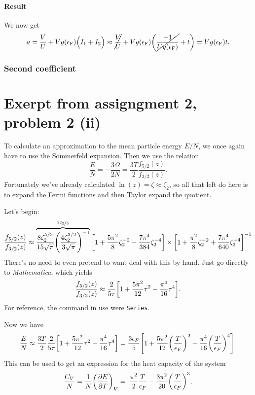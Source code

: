 \documentclass[11pt,letter, swedish, english
]{article}
\newcommand{\eF}{\ensuremath{\epsilon_{\text{F}}}}
\begin{document}
\paragraph{Result}
We now get
\begin{equation}
a=\frac{V}{U}+Vg(\eF)\Big(I_1+I_2\Big)
\approx\cancel{\frac{V}{U}}+
Vg(\eF)\qty(\cancel{\frac{-1}{Ug(\eF)}}+t)
=Vg(\eF)t.
\end{equation}

\subsubsection{Second coefficient}







\newpage
\appendix
\setcounter{equation}{0}
\renewcommand{\theequation}{A\arabic{equation}}

\section{Exerpt from assigngment 2, problem 2 (ii)}
\label{sec:ass_2_Cv}
To calculate an approximation to the mean particle energy $E/N$, we
once again have to use the Sommerfeld expansion. Then we use the relation
\begin{equation}
\frac{E}{N}=-\frac{3\Omega}{2N}=\frac{3T}{2}\frac{f_{5/2}(z)}{f_{3/2}(z)}.
\end{equation}
Fortunately we've already calculated $\ln(z)=\zeta\approx\zeta_2$, so all
that left do here is to expand the Fermi functions and then
Taylor expand the quotient.

Let's begin:
\begin{equation}
\frac{f_{5/2}(z)}{f_{3/2}(z)}\approx
\overbrace{\frac{8\zeta_2^{5/2}}{15\sqrt{\pi}}
\qty(\frac{4\zeta_2^{3/2}}{3\sqrt{\pi}})^{-1}}^{\nicefrac{2\zeta_2}{5}}
\qty[1+\frac{5\pi^2}{8}\zeta_2^{-2}
-\frac{7\pi^4}{384}\zeta_2^{-4} ]
\times \qty[1+\frac{\pi^2}{8}\zeta_2^{-2} 
+\frac{7\pi^4}{640}\zeta_2^{-4} ]^{-1}
\end{equation}
There's no need to even pretend to want deal with this by hand.
Just go directly to \emph{Mathematica}, which yields
\begin{equation}
\frac{f_{5/2}(z)}{f_{3/2}(z)}\approx \frac{2}{5\tau}
\qty[1+\frac{5\pi^2}{12}\tau^2-\frac{\pi^4}{16}\tau^4].
\end{equation}
For reference, the command in use were \texttt{Series}.

Now we have
\begin{equation}
\frac{E}{N}\approx\frac{3T}{2}\frac{2}{5\tau}
\qty[1+\frac{5\pi^2}{12}\tau^2-\frac{\pi^4}{16}\tau^4]
=\frac{3\epsilon_F}{5}\qty[1
+\frac{5\pi^2}{12}\qty(\frac{T}{\epsilon_F})^2
-\frac{\pi^4}{16}\qty(\frac{T}{\epsilon_F})^4].
\end{equation}
This can be used to get an expression for the heat capacity of the
system
\begin{equation}\label{eq:CV_Fermi}
\frac{C_V}{N}=\frac{1}{N}\qty(\pdv{E}{T})_V
=\;\frac{\pi^2}{2}\frac{T}{\epsilon_F}
 - \frac{3\pi^2}{20}\qty(\frac{T}{\epsilon_F})^3.
\end{equation}
\end{document}

